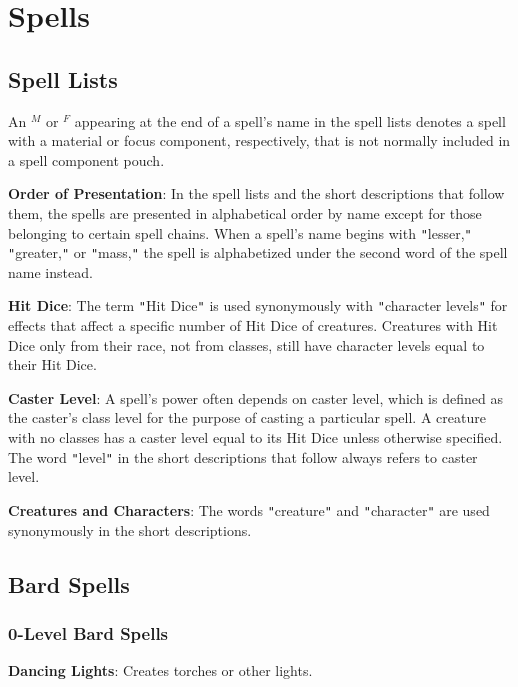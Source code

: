 \chapter{Spells}
\section{Spell Lists}

\label{f0}        
An \(^{M}\) or \(^{F}\) appearing at the end of a spell's name in the spell lists denotes a spell with a material or focus component, respectively, that is not normally included in a spell component pouch.

\textbf{Order of Presentation}: In the spell lists and the short descriptions that follow them, the spells are presented in alphabetical order by name except for those belonging to certain spell chains. When a spell's name begins with \texttt{{}"{}}lesser,\texttt{{}"{}} \texttt{{}"{}}greater,\texttt{{}"{}} or \texttt{{}"{}}mass,\texttt{{}"{}} the spell is alphabetized under the second word of the spell name instead.

\textbf{Hit Dice}: The term \texttt{{}"{}}Hit Dice\texttt{{}"{}} is used synonymously with \texttt{{}"{}}character levels\texttt{{}"{}} for effects that affect a specific number of Hit Dice of creatures. Creatures with Hit Dice only from their race, not from classes, still have character levels equal to their Hit Dice.

\textbf{Caster Level}: A spell's power often depends on caster level, which is defined as the caster's class level for the purpose of casting a particular spell. A creature with no classes has a caster level equal to its Hit Dice unless otherwise specified. The word \texttt{{}"{}}level\texttt{{}"{}} in the short descriptions that follow always refers to caster level.

\textbf{Creatures and Characters}: The words \texttt{{}"{}}creature\texttt{{}"{}} and \texttt{{}"{}}character\texttt{{}"{}} are used synonymously in the short descriptions.

\section{Bard Spells}


\subsection{0-Level Bard Spells}


\textbf{Dancing Lights}: Creates torches or other lights.

